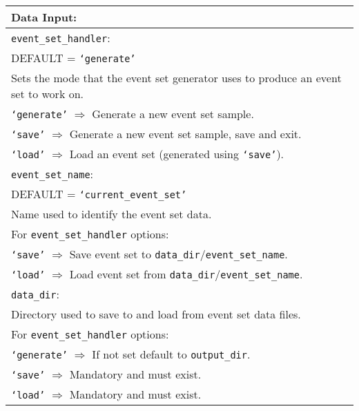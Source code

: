  \vspace{2em}
\begin{tabular}{|p{\textwidth}|}
\hline
\vspace{0.3em} \noindent \Large \textbf{Data Input:} \normalsize \\
\hline \vspace{0.1em} \texttt{event\_set\_handler}: \\
DEFAULT = \texttt{`generate'} \\
Sets the mode that the event set generator uses to produce an event set to work
on. \\
 \hspace{0.5em} \texttt{`generate'} $\Rightarrow$ Generate a new event set
 sample. \\
 \hspace{0.5em} \texttt{`save'} $\Rightarrow$ Generate a new event set sample,
 save and exit. \\
 \hspace{0.5em} \texttt{`load'} $\Rightarrow$ Load an event set (generated using
 \texttt{`save'}). \\
\hline \vspace{0.1em} \texttt{event\_set\_name}: \\
DEFAULT = \texttt{`current\_event\_set'} \\
Name used to identify the event set data. \\
For \texttt{event\_set\_handler} options: \\
 \hspace{0.5em} \texttt{`save'} $\Rightarrow$ Save event set to
 \texttt{data\_dir}/\texttt{event\_set\_name}. \\
 \hspace{0.5em} \texttt{`load'} $\Rightarrow$ Load event set from
 \texttt{data\_dir}/\texttt{event\_set\_name}. \\
\hline \vspace{0.1em} \texttt{data\_dir}: \\
Directory used to save to and load from event set data files. \\
For \texttt{event\_set\_handler} options: \\
 \hspace{0.5em} \texttt{`generate'} $\Rightarrow$ If not set default to 
 \texttt{output\_dir}. \\
 \hspace{0.5em} \texttt{`save'} $\Rightarrow$ Mandatory and must exist. \\
 \hspace{0.5em} \texttt{`load'} $\Rightarrow$ Mandatory and must exist. \\
 
\hline
 \end{tabular}
 
